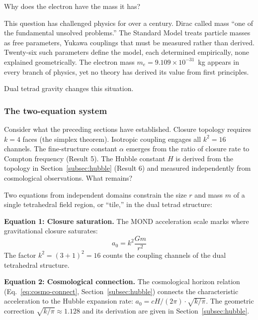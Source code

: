 \documentclass[aps,prd,preprint,superscriptaddress,showpacs,preprintnumbers,amsmath,amssymb,nofootinbib]{revtex4-2}
\begin{document}
Why does the electron have the mass it has?

This question has challenged physics for over a century. Dirac called mass ``one of the fundamental unsolved problems.'' The Standard Model treats particle masses as free parameters, Yukawa couplings that must be measured rather than derived. Twenty-six such parameters define the model, each determined empirically, none explained geometrically. The electron mass $m_e = 9.109 \times 10^{-31}$~kg appears in every branch of physics, yet no theory has derived its value from first principles.

Dual tetrad gravity changes this situation.

\subsubsection*{The two-equation system}

Consider what the preceding sections have established. Closure topology requires $k = 4$ faces (the simplex theorem). Isotropic coupling engages all $k^2 = 16$ channels. The fine-structure constant $\alpha$ emerges from the ratio of closure rate to Compton frequency (Result 5). The Hubble constant $H$ is derived from the topology in Section~\ref{subsec:hubble} (Result 6) and measured independently from cosmological observations. What remains?

Two equations from independent domains constrain the size $r$ and mass $m$ of a single tetrahedral field region, or ``tile,'' in the dual tetrad structure:

\textbf{Equation 1: Closure saturation.} The MOND acceleration scale marks where gravitational closure saturates:
\begin{equation}
a_0 = k^2 \frac{Gm}{r^2}
\label{eq:closure-sat}
\end{equation}
The factor $k^2 = (3+1)^2 = 16$ counts the coupling channels of the dual tetrahedral structure.

\textbf{Equation 2: Cosmological connection.} The cosmological horizon relation (Eq.~\ref{eq:cosmo-connect}, Section~\ref{subsec:hubble}) connects the characteristic acceleration to the Hubble expansion rate: $a_0 = cH/(2\pi) \cdot \sqrt{k/\pi}$. The geometric correction $\sqrt{k/\pi} \approx 1.128$ and its derivation are given in Section~\ref{subsec:hubble}.
\end{document}
